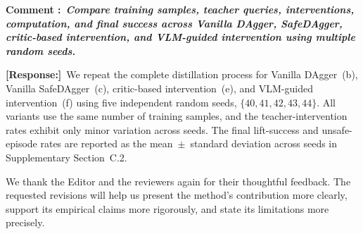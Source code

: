 \documentclass[12pt]{article}
\newcommand{\response}{\par\smallskip\noindent\textcolor{responseblue}{\textbf{[Response:]}}\ }
\newcounter{reviewcomment}
\newcounter{reviewer}
\newcommand{\reviewcomment}[1]{%
  \refstepcounter{reviewcomment}
  \par\medskip\noindent\textbf{Comment \thereviewcomment:}\ 
  \textbf{\itshape #1}\par
}
\begin{document}
\reviewcomment{Compare training samples, teacher queries, interventions,
computation, and final success across Vanilla DAgger, SafeDAgger, critic-based
intervention, and VLM-guided intervention using multiple random seeds.}

\response We repeat the complete distillation process for Vanilla DAgger~(b),
Vanilla SafeDAgger~(c), critic-based intervention~(e), and VLM-guided
intervention~(f) using five independent random seeds,
$\{40,41,42,43,44\}$. All variants use the same number of training samples, and
the teacher-intervention rates exhibit only minor variation across seeds. The
final lift-success and unsafe-episode rates are reported as the mean~$\pm$~standard
deviation across seeds in Supplementary Section~C.2.

\vspace{1em}
We thank the Editor and the reviewers again for their thoughtful feedback. The
requested revisions will help us present the method's contribution more clearly,
support its empirical claims more rigorously, and state its limitations more
precisely.
\end{document}
